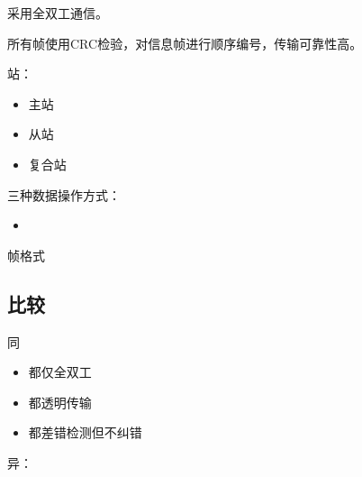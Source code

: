 采用全双工通信。

所有帧使用CRC检验，对信息帧进行顺序编号，传输可靠性高。

站：\begin{itemize}
    \item 主站
    \item 从站
    \item 复合站
\end{itemize}

三种数据操作方式：\begin{itemize}
    \item 
\end{itemize}

帧格式


\subsection{比较}
同\begin{itemize}
    \item 都仅全双工
    \item 都透明传输
    \item 都差错检测但不纠错
\end{itemize}

异：
